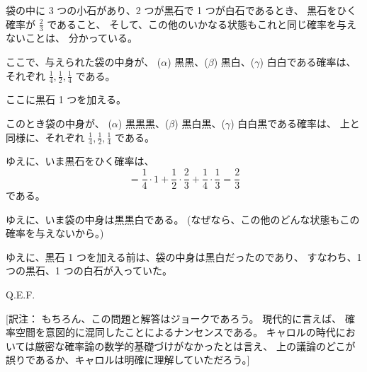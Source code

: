 袋の中に 3 つの小石があり、2 つが黒石で 1 つが白石であるとき、
黒石をひく確率が $\frac{2}{3}$ であること、
そして、この他のいかなる状態もこれと同じ確率を与えないことは、
分かっている。

ここで、与えられた袋の中身が、
($\alpha$) 黒黒、($\beta$) 黒白、($\gamma$) 白白である確率は、
それぞれ $\frac{1}{4},\frac{1}{2},\frac{1}{4}$ である。

ここに黒石 1 つを加える。

このとき袋の中身が、
($\alpha$) 黒黒黒、($\beta$) 黒白黒、($\gamma$) 白白黒である確率は、
上と同様に、それぞれ $\frac{1}{4},\frac{1}{2},\frac{1}{4}$ である。

ゆえに、いま黒石をひく確率は、
\[
= \frac{1}{4} \cdot 1 + \frac{1}{2} \cdot \frac{2}{3}
+\frac{1}{4} \cdot \frac{1}{3} = \frac{2}{3}
\]
である。

ゆえに、いま袋の中身は黒黒白である。
(なぜなら、この他のどんな状態もこの確率を与えないから。)

ゆえに、黒石 1 つを加える前は、袋の中身は黒白だったのであり、
すなわち、1 つの黒石、1 つの白石が入っていた。

Q.E.F.

[訳注： もちろん、この問題と解答はジョークであろう。
現代的に言えば、
確率空間を意図的に混同したことによるナンセンスである。
キャロルの時代においては厳密な確率論の数学的基礎づけがなかったとは言え、
上の議論のどこが誤りであるか、キャロルは明確に理解していただろう。]

